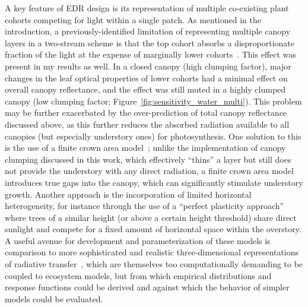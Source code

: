 A key feature of EDR design is its representation of multiple co-existing plant cohorts competing for light within a single patch. 
As mentioned in the introduction, a previously-identified limitation of representing multiple canopy layers in a two-stream scheme is that the top cohort absorbs a disproportionate fraction of the light at the expense of marginally lower cohorts~\cite{fisher_2010_assessing}.
This effect was present in my results as well.
In a closed canopy (high clumping factor), major changes in the leaf optical properties of lower cohorts had a minimal effect on overall canopy reflectance, and the effect was still muted in a highly clumped canopy (low clumping factor; Figure~\ref{fig:sensitivity_water_multi}).
This problem may be further exacerbated by the over-prediction of total canopy reflectance discussed above, as this further reduces the absorbed radiation available to all canopies (but especially understory ones) for photosynthesis.
One solution to this is the use of a finite crown area model~\cite{dietze_capturing_2008};
unlike the implementation of canopy clumping discussed in this work, which effectively ``thins'' a layer but still does not provide the understory with any direct radiation, a finite crown area model introduces true gaps into the canopy, which can significantly stimulate understory growth. 
Another approach is the incorporation of limited horizontal heterogeneity, for instance through the use of a ``perfect plasticity approach''~\cite{weng_2015_ppa} where trees of a similar height (or above a certain height threshold) share direct sunlight and compete for a fixed amount of horizontal space within the overstory.
A useful avenue for development and parameterization of these models is comparison to more sophisticated and realistic three-dimensional representations of radiative transfer~\cite[e.g.][]{widlowski_2007_third}, which are themselves too computationally demanding to be coupled to ecosystem models, but from which empirical distributions and response functions could be derived and against which the behavior of simpler models could be evaluated.

